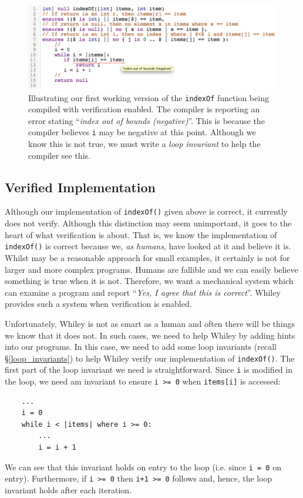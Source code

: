 \begin{figure}[!t]
\centering
\includegraphics[width=1.0\textwidth]{../images/indexOf.png}
\caption{Illustrating our first working version of the
  \lstinline{indexOf} function being compiled with verification
  enabled.  The compiler is reporting an error stating ``{\em index out of
  bounds (negative)}''.  This is because the compiler believes
  \lstinline{i} may be negative at this point.  Although we know this
  is not true, we must write a {\em loop invariant} to help the
  compiler see this.}
\label{eg_indexOf}
\end{figure}

\subsection{Verified Implementation}
Although our implementation of \lstinline{indexOf()} given above is
correct, it currently does not verify.  Although this distinction may
seem unimportant, it goes to the heart of what verification is about.
That is, we know the implementation of \lstinline{indexOf()} is
correct because we, {\em as humans}, have looked at it and believe it
is.  Whilst may be a reasonable approach for small examples, it
certainly is not for larger and more complex programs.  Humans are
fallible and we can easily believe something is true when it is not.
Therefore, we want a mechanical system which can examine a program and
report ``{\em Yes, I agree that this is correct}''.  Whiley provides
such a system when verification is enabled.  

Unfortunately, Whiley is not as smart as a human and often there will
be things we know that it does not.  In such cases, we need to help
Whiley by adding hints into our programs.  In this case, we need to
add some loop invariants (recall \S\ref{loop_invariants}) to help
Whiley verify our implementation of \lstinline{indexOf()}.  The first
part of the loop invariant we need is straightforward.  Since
\lstinline{i} is modified in the loop, we need am invariant to ensure
\lstinline{i >= 0} when \lstinline{items[i]} is accessed:

\begin{lstlisting}
    ...
    i = 0
    while i < |items| where i >= 0:
        ...
        i = i + 1    
\end{lstlisting}
We can see that this invariant holds on entry to the loop (i.e. since
\lstinline{i = 0} on entry).  Furthermore, if \lstinline{i >= 0} then \lstinline{i+1 >= 0} follows and, hence, the loop
invariant holds after each iteration.
